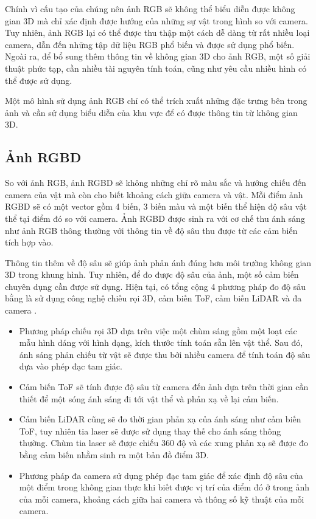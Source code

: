 Chính vì cấu tạo của chúng nên ảnh RGB sẽ không thể biểu diễn được không gian 3D mà chỉ xác định được hướng của những sự vật trong hình so với camera. Tuy nhiên, ảnh RGB lại có thể được thu thập một cách dễ dàng từ rất nhiều loại camera, dẫn đến những tập dữ liệu RGB phổ biến và được sử dụng phổ biến. Ngoài ra, để bổ sung thêm thông tin về không gian 3D cho ảnh RGB, một số giải thuật phức tạp, cần nhiều tài nguyên tính toán, cũng như yêu cầu nhiều hình có thể được sử dụng.

Một mô hình sử dụng ảnh RGB chỉ có thể trích xuất những đặc trưng bên trong ảnh và cần sử dụng biểu diễn của khu vực để có được thông tin từ không gian 3D.

\subsection{Ảnh RGBD}

So với ảnh RGB, ảnh RGBD sẽ không những chỉ rõ màu sắc và hướng chiếu đến camera của vật mà còn cho biết khoảng cách giữa camera và vật. Mỗi điểm ảnh RGBD sẽ có một vector gồm 4 biến, 3 biến màu và một biến thể hiện độ sâu vật thể tại điểm đó so với camera. Ảnh RGBD được sinh ra với cơ chế thu ánh sáng như ảnh RGB thông thường với thông tin về độ sâu thu được từ các cảm biến tích hợp vào.

Thông tin thêm về độ sâu sẽ giúp ảnh phản ánh đúng hơn môi trường không gian 3D trong khung hình. Tuy nhiên, để đo được độ sâu của ảnh, một số cảm biến chuyên dụng cần được sử dụng. Hiện tại, có tổng cộng 4 phương pháp đo độ sâu bằng là sử dụng công nghệ chiếu rọi 3D, cảm biến ToF, cảm biến LiDAR và đa camera \cite{lopes2022survey}.
\begin{itemize}
    \item Phương pháp chiếu rọi 3D dựa trên việc một chùm sáng gồm một loạt các mẫu hình dáng với hình dạng, kích thước tính toán sẵn lên vật thể. Sau đó, ánh sáng phản chiếu từ vật sẽ được thu bởi nhiều camera để tính toán độ sâu dựa vào phép đạc tam giác.
    \item Cảm biến ToF sẽ tính được độ sâu từ camera đến ảnh dựa trên thời gian cần thiết để một sóng ánh sáng đi tới vật thể và phản xạ về lại cảm biến.
    \item Cảm biến LiDAR cũng sẽ đo thời gian phản xạ của ánh sáng như cảm biến ToF, tuy nhiên tia laser sẽ được sử dụng thay thế cho ánh sáng thông thường. Chùm tia laser sẽ được chiếu 360 độ và các xung phản xạ sẽ được đo bằng cảm biến nhằm sinh ra một bản đồ điểm 3D.
    \item Phương pháp đa camera sử dụng phép đạc tam giác để xác định độ sâu của một điểm trong không gian thực khi biết được vị trí của điểm đó ở trong ảnh của mỗi camera, khoảng cách giữa hai camera và thông số kỹ thuật của mỗi camera.
\end{itemize}

